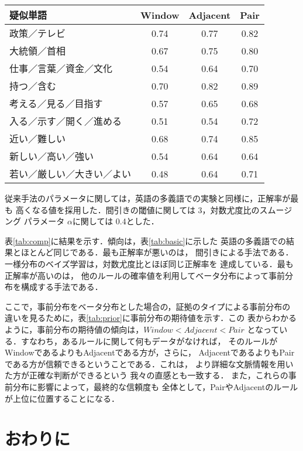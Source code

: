 \begin{table*}
  \caption{事前分布の期待値}
  
  \label{tab:prior}
\begin{center}
\begin{tabular}{l|c|c|c} \hline
疑似単語 			&Window &Adjacent	&Pair	 \\
\hline
政策／テレビ			&0.74	&0.77	&0.82  \\
大統領／首相			&0.67   &0.75   &0.80  \\
仕事／言葉／資金／文化		&0.54   &0.64   &0.70  \\
持つ／含む			&0.70   &0.82   &0.89  \\
考える／見る／目指す		&0.57   &0.65   &0.68  \\
入る／示す／開く／進める	&0.51   &0.54   &0.72  \\
近い／難しい			&0.68   &0.74   &0.85  \\
新しい／高い／強い		&0.54   &0.64   &0.64  \\
若い／厳しい／大きい／よい 	&0.48   &0.64   &0.71  \\
\hline
\end{tabular}
\end{center}
\end{table*}

従来手法のパラメータに関しては，英語の多義語での実験と同様に，正解率が最も
高くなる値を採用した．間引きの閾値に関しては 3，対数尤度比のスムージング
パラメータ $\alpha$に関しては 0.4とした．

表\ref{tab:comp}に結果を示す．傾向は，表\ref{tab:basic}に示した
英語の多義語での結果とほとんど同じである．最も正解率が悪いのは，
間引きによる手法である．一様分布のベイズ学習は，対数尤度比とほぼ同じ正解率を
達成している．最も正解率が高いのは，
他のルールの確率値を利用してベータ分布によって事前分布を構成する手法である．

ここで，事前分布をベータ分布とした場合の，証拠のタイプによる事前分布の
違いを見るために，表\ref{tab:prior}に事前分布の期待値を示す．この
表からわかるように，事前分布の期待値の傾向は，$Window < Adjacent < Pair$
となっている．すなわち，あるルールに関して何もデータがなければ，
そのルールがWindowであるよりもAdjacentである方が，さらに，
AdjacentであるよりもPairである方が信頼できるということである．これは，
より詳細な文脈情報を用いた方が正確な判断ができるという
我々の直感とも一致する．
また，これらの事前分布に影響によって，最終的な信頼度も
全体として，PairやAdjacentのルールが上位に位置することになる．


\clearpage
\section{おわりに}

